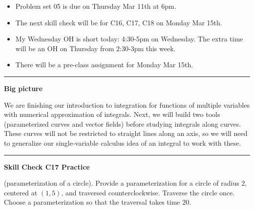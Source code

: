 \documentclass[12pt,letterpaper,noanswers]{exam}
\begin{document}
 \pdfpageheight 11in 
  \pdfpagewidth 8.5in





\begin{itemize}
\itemsep0em
    \item Problem set 05 is due on Thursday Mar 11th at 6pm.
    \item The next skill check will be for C16, C17, C18 on Monday Mar 15th.
    \item My Wednesday OH is short today: 4:30-5pm on Wednesday.  The extra time will be an OH on Thursday from 2:30-3pm this week.
    \item There will be a pre-class assignment for Monday Mar 15th.
\end{itemize}

\hrule
\vspace{0.2cm}


\noindent\textbf{Big picture}

We are finishing our introduction to integration for functions of multiple variables with numerical approximation of integrals.  Next, we will build two tools (parameterized curves and vector fields) before studying integrals along curves.  These curves will not be restricted to straight lines along an axis, so we will need to generalize our single-variable calculus idea of an integral to work with these. 

\vspace{0.2cm}
\hrule
\vspace{0.2cm}



\noindent\textbf{Skill Check C17 Practice}
\begin{questions}
\question (parameterization of a circle). Provide a parameterization for a circle of radius $2$, centered at $(1,5)$, and traversed counterclockwise.  Traverse the circle once.  Choose a parameterization so that the traversal takes time $20$.

\end{questions}
\end{document}
